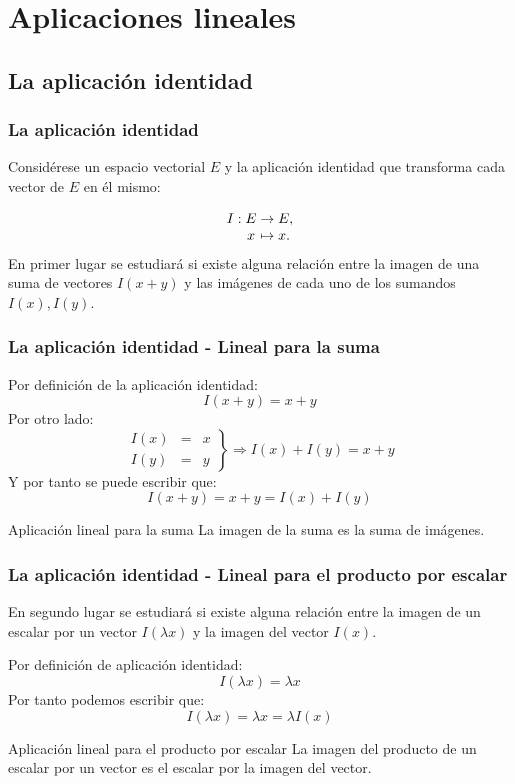 \documentclass{beamer}
\begin{document}
\section{Aplicaciones lineales}
\subsection{La aplicaci\'on identidad}
\begin{frame}
  \frametitle{La aplicaci\'on identidad}

Consid\'erese un espacio vectorial $E$ y la aplicaci\'on identidad que transforma cada vector de $E$ en \'el mismo:   
  
  \[
  \begin{array}{@{}r@{\;}c@{\;}c@{\;}l@{}}
    I: & E & \rightarrow & E,   \\
       & x & \mapsto     & x.
  \end{array}
\]
En primer lugar se estudiar\'a si existe alguna relaci\'on entre la imagen de una suma de vectores $I(x+y)$ y las im\'agenes de cada uno de los sumandos $I(x),I(y)$. 

\end{frame}

\begin{frame}
  \frametitle{La aplicaci\'on identidad - Lineal para la suma}

Por definici\'on de la aplicaci\'on identidad:
  \[
I(x+y) = x+y
\]
Por otro lado:
\[\left.\begin{array}{ccc}I(x) & = & x \\I(y) & =  & y\end{array}\right\} \Rightarrow I(x)+I(y) = x+y\]
Y por tanto se puede escribir que:
\[I(x+y) = x+y = I(x)+I(y)\]
 \begin{block}{Aplicaci\'on lineal para la suma}
La imagen de la suma es la suma de im\'agenes.
\end{block}

\end{frame}


\begin{frame}
  \frametitle{La aplicaci\'on identidad - Lineal para el producto por escalar}

En segundo lugar se estudiar\'a si existe alguna relaci\'on entre la imagen de un escalar por un vector $I(\lambda x)$ y la imagen del vector $I(x)$. 

Por definici\'on de aplicaci\'on identidad:
  \[
I(\lambda x) = \lambda x
\]
Por tanto podemos escribir que:
\[I(\lambda x) = \lambda x= \lambda I(x)\]
 \begin{block}{Aplicaci\'on lineal para el producto por escalar}
La imagen del producto de un escalar por un vector es el escalar por la imagen del vector.
\end{block}
\end{frame}
\end{document}
